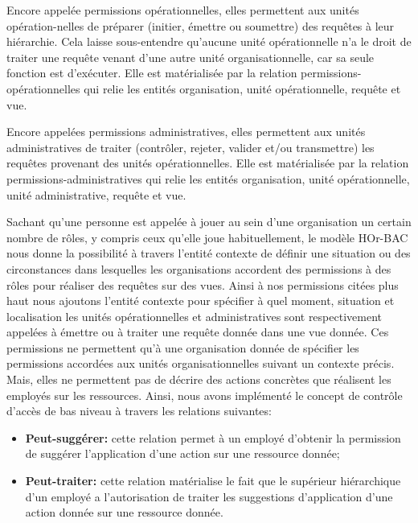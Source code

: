 \label{sectionPolitiqueHOr-BAC}

Encore appelée permissions opérationnelles, elles permettent aux unités opération-nelles de préparer (initier, émettre ou soumettre) des requêtes à leur hiérarchie. Cela laisse sous-entendre qu'aucune unité opérationnelle n'a le droit de traiter une requête venant d'une autre unité organisationnelle, car sa seule fonction est d'exécuter. Elle est matérialisée par la relation permissions-opérationnelles qui relie les entités organisation, unité opérationnelle, requête et vue.

\label{sectionPolitiqueHOr-BACC}
Encore appelées permissions administratives, elles permettent aux unités administratives de traiter (contrôler, rejeter, valider et/ou transmettre) les requêtes provenant des unités opérationnelles. Elle est matérialisée par la relation permissions-administratives qui relie les entités organisation, unité opérationnelle, unité administrative, requête et vue. 

\label{sectionPolitiqueHOr-BACBAS}

 Sachant qu'une personne est appelée à jouer au sein d'une organisation un certain nombre de rôles, y compris ceux qu'elle joue habituellement, le modèle HOr-BAC nous donne la possibilité à travers l'entité contexte de définir une situation ou des circonstances dans lesquelles les organisations accordent des permissions à des rôles pour réaliser des requêtes sur des vues. Ainsi à nos permissions citées plus haut nous ajoutons l'entité contexte pour spécifier à quel moment, situation et localisation les unités opérationnelles et administratives sont respectivement appelées à émettre ou à traiter une requête donnée dans une vue donnée. Ces permissions ne permettent qu'à une organisation donnée de spécifier les permissions accordées aux unités organisationnelles suivant un contexte précis. Mais, elles ne permettent pas de  décrire des actions concrètes que réalisent les employés sur les ressources. Ainsi, nous avons implémenté le concept de contrôle d'accès de bas niveau à travers les relations suivantes:
\begin{itemize}
\item \textbf{Peut-suggérer:} cette relation permet à un employé d'obtenir la permission de suggérer l'application d'une action sur une ressource donnée;
\item \textbf{Peut-traiter:} cette relation matérialise le fait que le supérieur hiérarchique d'un employé a l'autorisation de traiter les suggestions d'application d'une action donnée sur une ressource donnée.
\end{itemize}

